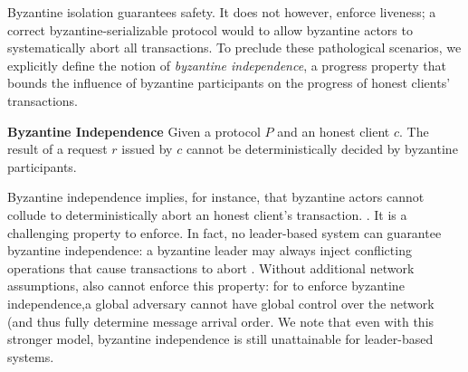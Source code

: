 %
%

Byzantine isolation guarantees safety. It does not however, enforce liveness; a correct byzantine-serializable protocol would to allow byzantine actors to systematically abort all transactions. To preclude these pathological scenarios, we explicitly define the notion of \textit{byzantine independence}, a progress property that bounds the influence of byzantine participants on the progress of honest clients' transactions.

\par \textbf{Byzantine Independence} Given a protocol $P$ and an honest client $c$. The result of a request $r$ issued by $c$ cannot be deterministically decided by byzantine participants. %

Byzantine independence implies, for instance, that byzantine actors cannot collude to deterministically abort an honest client's transaction. . It is a challenging property to enforce.
In fact, no leader-based system can guarantee byzantine independence: a byzantine leader may always inject conflicting operations that cause transactions to abort
. Without additional network assumptions,
\sys{} also cannot enforce this property: for \sys{} to enforce byzantine independence,a global adversary cannot have global control over the network (and thus fully determine message arrival order. We note that even with this stronger model, byzantine independence is still unattainable for leader-based systems.


